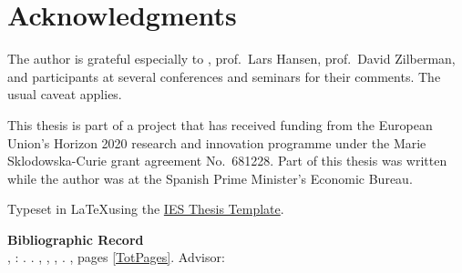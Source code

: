 \section*{Acknowledgments}
The author is grateful especially to \Supervisor, prof.\ Lars Hansen, prof.\ David Zilberman, and participants at several conferences and seminars for their comments. The usual caveat applies.

This thesis is part of a project that has received funding from the European Union's Horizon 2020 research and innovation programme under the Marie Sklodowska-Curie grant agreement No.\ 681228. Part of this thesis was written while the author was at the Spanish Prime Minister's Economic Bureau.



\vfill

\noindent Typeset in \LaTeX  using the \href{https://is.cuni.cz/studium/eng/predmety/index.php?do=predmet&kod=JEM001}{IES Thesis Template}. 

\bigskip

\noindent \textbf{Bibliographic Record} \\
\LastNameDP, \FirstNameDP: \emph{\Bookname}. \BookName. \CUNI, \FSS, \IES, \Place. \Year, pages \ref*{TotPages}. Advisor: \Supervisor


